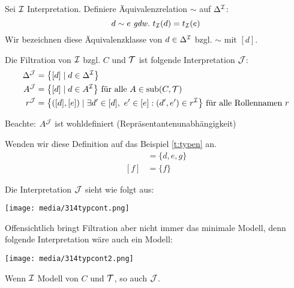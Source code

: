 \begin{definition}[Filtration]

Sei $\mathcal{I}$ Interpretation. Definiere Äquivalenzrelation $\sim$ auf
$\Delta^{\mathcal{I}}$: $$d \sim e \gdw t_\MI\left( d \right) = t_\MI\left( e \right)$$
Wir bezeichnen diese Äquivalenzklasse von $d \in \Delta^{\mathcal{I}}$ bzgl. $\sim$ mit $\left\lbrack d \right\rbrack$.

Die Filtration von $\mathcal{I}$ bzgl. $C$ und $\mathcal{T}$ ist folgende Interpretation $\mathcal{J}$:
\begin{align*}
    \Delta^{\MJ} &= \left\{ \left\lbrack d \right\rbrack \mid d \in \Delta^\MI \right\}\\
    A^{\MJ} &= \left\{ \left\lbrack d \right\rbrack \mid d \in A^\MI \right\}
  \text{ für alle }A \in \sub\left( C,\MT \right)\\
  r^{\MJ} &= \left\{ \left( \left\lbrack d \right\rbrack,\left\lbrack e \right\rbrack \right) \mid \exists d' \in \left\lbrack d \right\rbrack,\ e' \in \left\lbrack e \right\rbrack:\left( d',e' \right) \in r^\MI \right\}
  \text{ für alle Rollennamen } r
\end{align*}

Beachte: $A^{\mathcal{J}}$ ist wohldefiniert (Repräsentantenunabhängigkeit)
\end{definition}

\begin{tafel} [continues=t:typen]
Wenden wir diese Definition auf das Beispiel \autoref{t:typen} an.
\begin{align*}
    [d]&=\{d,e,g\}\\
    [f]&=\{f\}
\end{align*}

Die Interpretation $\mathcal{J}$ sieht wie folgt aus:

\texttt{[image: media/314typcont.png]}

Offensichtlich bringt Filtration aber nicht immer das minimale Modell, denn folgende Interpretation wäre auch ein Modell:

\texttt{[image: media/314typcont2.png]}
\end{tafel}

\begin{theorem} 
    \label{thm:filtration}
Wenn $\mathcal{I}$ Modell von $C$ und $\mathcal{T}$, so auch $\mathcal{J}$.
\end{theorem}

